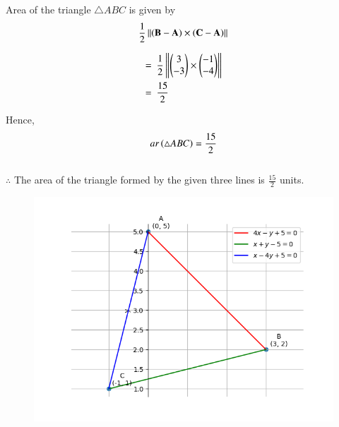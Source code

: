 \documentclass[journal]{IEEEtran}
\begin{document}
Area of the triangle $\triangle ABC$ is given by
\begin{align}
    \frac{1}{2}\left\lVert\left(\mathbf{B-A}\right)\times\left(\mathbf{C-A}\right)\right\rVert
\end{align}

\begin{align}
    =&\ \ \frac{1}{2}\left\lVert\begin{pmatrix}3\\-3\end{pmatrix}\times\begin{pmatrix}-1\\-4\end{pmatrix}\right\rVert\\
    =&\ \ \frac{15}{2}
\end{align}

Hence,
\begin{align}
    ar\left(\triangle ABC\right) = \frac{15}{2}
\end{align}\\

$\therefore$ The area of the triangle formed by the given three lines is $\frac{15}{2}$ units. 

\begin{figure}[H]
    \centering
    \includegraphics[width=1\columnwidth]{Figs/plot(py).png}
\end{figure}
\end{document}
